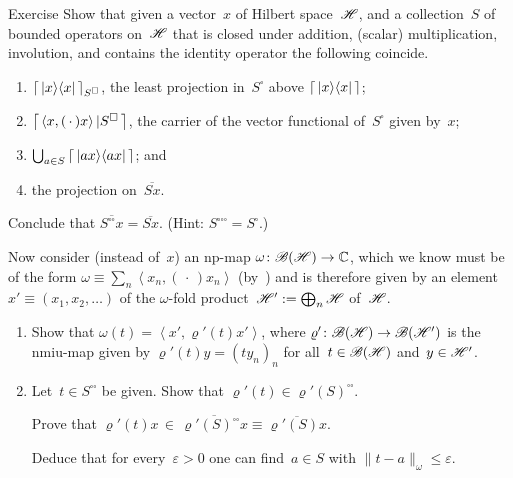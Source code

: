 \documentclass[a]{subfiles}
\begin{document}
\begin{parsec}
\begin{point}{Exercise}%
Show that given a vector~$x$ of Hilbert space~$\mathscr{H}$,
and a collection~$S$ of bounded operators on~$\mathscr{H}$
that is closed under addition, (scalar) multiplication,
involution, and contains the identity operator
the following coincide.
\begin{enumerate}
\item
$\left\lceil\,\left|x\right>\!\left<x\right|\,\right\rceil_{S^\square}$,
the least projection in~$S^\square$
above $\left\lceil\,\left|x\right>\!\left<x\right|\,\right\rceil$;
\item
$\left\lceil\,\left<x,(\,\cdot\,)x\right>|S^\square\,\right\rceil$,
the carrier of the vector functional of~$S^\square$
given by~$x$;
\item
$\bigcup_{a\in S} \left\lceil\,\left|ax\right>\!\left<ax\right|\,\right\rceil$; and 
\item
the projection on~$\overline{S x}$.
\end{enumerate}
Conclude that $\overline{S^{\square\square}x}
=\overline{S x}$.
(Hint: $S^{\square\square\square}=S^\square$.)
\begin{point}%
Now consider
(instead of~$x$)
an np-map $\omega\colon \mathscr{B}(\mathscr{H})\to \mathbb{C}$,
which we know must be of the form
$\omega\equiv \sum_n \left<x_n,(\,\cdot\,)x_n\right>$
(by~)
and is therefore given by 
an element $x'\equiv (x_1,x_2,\dotsc)$ of the $\omega$-fold
product~$\mathscr{H}':=\bigoplus_n\mathscr{H}$ of~$\mathscr{H}$.
\begin{enumerate}
\item
Show that  $\omega(t)=\left<x',\varrho'(t)x'\right>$,
where $\varrho'\colon \mathscr{B}(\mathscr{H})\to\mathscr{B}(\mathscr{H}')$
is the nmiu-map given by 
$\varrho'(t)y=(ty_n)_n$
for all~$t\in\mathscr{B}(\mathscr{H})$ and~$y\in\mathscr{H}'$.

\item
Let~$t\in S^{\square\square}$ be given.
Show that $\varrho'(t)\in \varrho'(S)^{\square\square}$.

Prove that  $\varrho'(t)x\,\in\,\overline{\varrho'(S)^{\square\square}x}
\equiv \overline{\varrho'(S)x}$.

Deduce
that for every~$\varepsilon>0$
one can find~$a\in S$ with $\|t-a\|_\omega \leq \varepsilon$.


\end{enumerate}
\end{point}
\end{point}
\end{parsec}
\end{document}
